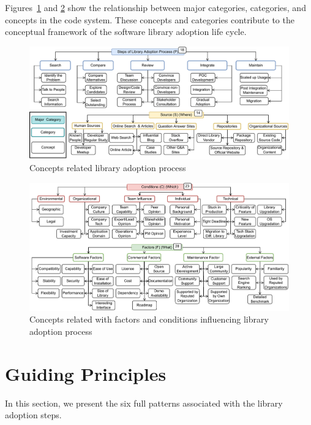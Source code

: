 Figures~\ref{fig:process} and \ref{fig:conditions} show the relationship between major categories, categories, and concepts in the code system. These concepts and categories contribute to the conceptual framework of the software library adoption life cycle.

\begin{figure}
    \centering
    \includegraphics[scale=0.85]{images/process.pdf}
    \caption{Concepts related library adoption process}
    \label{fig:process}
\end{figure}

\begin{figure}
    \centering
    \includegraphics[scale=0.85]{images/conditions.pdf}
    \caption{Concepts related with factors and conditions influencing library adoption process}
    \label{fig:conditions}
\end{figure}

\section{Guiding Principles}
In this section, we present the six full patterns associated with the library adoption steps.

\FloatBarrier





